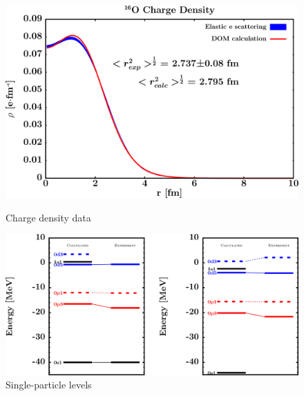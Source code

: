 \begin{figure}[H]
    \centering
    \begin{minipage}{0.45\textwidth}
        \centering
        \includegraphics[width=1.0\textwidth]{figures/o16_chargeDensity.png}
        \caption{Charge density data}
        \label{DOMFitData_o16_chargeDensity}
    \end{minipage}\hfill
    \begin{minipage}{0.45\textwidth}
        \centering
        \includegraphics[width=1.0\textwidth]{figures/o16_SPLevels.png}
        \caption{Single-particle levels}
        \label{DOMFitData_o16_SPLevels}
    \end{minipage}
\end{figure}

\afterpage{\clearpage}

